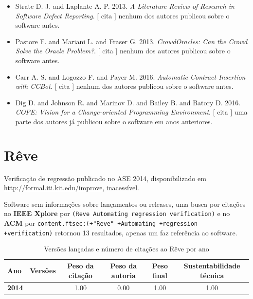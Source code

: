 \begin{itemize}
\item Strate D. J. and Laplante A. P.
      2013.
        \textit{ A Literature Review of Research in Software Defect Reporting}.
      [
          cita
      ]
nenhum dos autores publicou sobre o software antes.
\item Pastore F. and Mariani L. and Fraser G.
      2013.
        \textit{ CrowdOracles: Can the Crowd Solve the Oracle Problem?}.
      [
          cita
      ]
nenhum dos autores publicou sobre o software antes.
\item Carr A. S. and Logozzo F. and Payer M.
      2016.
        \textit{ Automatic Contract Insertion with CCBot}.
      [
          cita
      ]
nenhum dos autores publicou sobre o software antes.
\item Dig D. and Johnson R. and Marinov D. and Bailey B. and Batory D.
      2016.
        \textit{ COPE: Vision for a Change-oriented Programming Environment}.
      [
          cita
      ]
uma parte dos autores já publicou sobre o software em anos anteriores.
\end{itemize}
\section{Rêve}

Verificação de regressão
publicado no ASE 2014,
disponibilizado em \url{http://formal.iti.kit.edu/improve},
inacessível.

Software sem informações sobre lançamentos ou releases,
uma busca por citações no {\bf IEEE Xplore} por
\texttt{(Reve Automating regression verification)}
e no {\bf ACM} por
\texttt{content.ftsec:(+"Reve" +Automating +regression +verification)}
retornou
13 resultados,
apenas um faz referência ao software.


\begin{table}[H]
\caption{Versões lançadas e número de citações ao Rêve por ano}
\centering
\begin{tabular}{| l | c | c | c | c | c |}
  \hline
  Ano & Versões & Peso da citação & Peso da autoria & Peso final & Sustentabilidade técnica \\
  \hline
            {\bf 2014}
          &
          
          &
          1.00
          &
          0.00
          &
          1.00
          &
            {\color{blue} 1.00}
          \\
\hline
\end{tabular}
\end{table}

